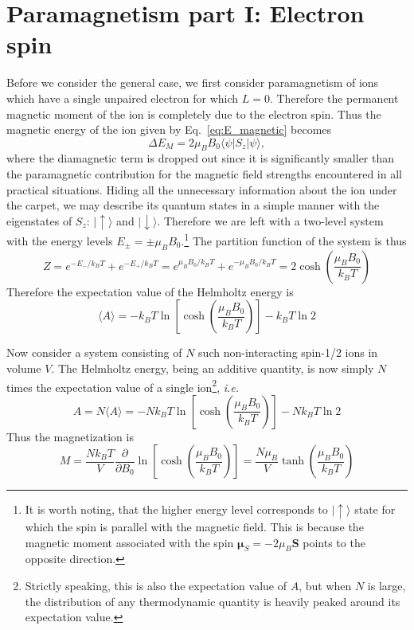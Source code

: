 \section{Paramagnetism part I: Electron spin}
Before we consider the  general case, we first consider paramagnetism of ions which have a single unpaired electron for which $L = 0$. Therefore the permanent magnetic moment of the ion is completely due to the electron spin. Thus the magnetic energy of the ion given by Eq.~\eqref{eq:E_magnetic} becomes
\begin{equation}
\Delta E_M = 2 \mu_B B_0 \langle \psi | S_z | \psi \rangle,
\end{equation} 
where the diamagnetic term is dropped out since it is significantly smaller than the paramagnetic contribution for the magnetic field strengths encountered in all practical situations. 
Hiding all the unnecessary information about the ion under the carpet, we may describe its quantum states in a simple manner with the eigenstates of $S_z$: $| \uparrow \rangle$ and $| \downarrow \rangle$. Therefore we are left with a two-level system with the energy levels $E_{\pm} = \pm \mu_B B_0$.\footnote{It is worth noting, that the higher energy level corresponds to $| \uparrow \rangle$ state for which the spin is parallel with the magnetic field. This is because the magnetic moment associated with the spin $\boldsymbol{\mu}_S = - 2\mu_B \mathbf{S}$ points to the opposite direction.} The partition function of the system is thus
\begin{equation}
Z = e^{-E_-/k_B T} + e^{-E_+/k_B T} = e^{\mu_B B_0/k_B T} + e^{-\mu_B B_0/k_B T} = 2 \cosh \left( \frac{\mu_B B_0}{k_B T} \right)
\end{equation}
Therefore the expectation value of the Helmholtz energy is 
\begin{equation}
\langle A \rangle = - k_B T \ln \left[ \cosh \left( \frac{\mu_B B_0}{k_B T} \right) \right] - k_B T \ln 2
\end{equation}

Now consider a system consisting of $N$ such non-interacting spin-1/2 ions in volume $V$. The Helmholtz energy, being an additive quantity, is now simply $N$ times the expectation value of a single ion\footnote{Strictly speaking, this is also the expectation value of $A$, but when $N$ is large, the distribution of any thermodynamic quantity is heavily peaked around its expectation value.}, \emph{i.e.}
\begin{equation}
A = N \langle A \rangle = - N k_B T \ln \left[ \cosh \left( \frac{\mu_B B_0}{k_B T} \right) \right] - N k_B T \ln 2
\end{equation}
Thus the magnetization is 
\begin{equation}
M = \frac{N k_B T}{V} \frac{\partial}{\partial B_0} \ln \left[ \cosh \left( \frac{\mu_B B_0}{k_B T} \right) \right]
= \frac{N \mu_B}{V} \tanh \left( \frac{\mu_B B_0}{k_B T} \right)
\end{equation}

